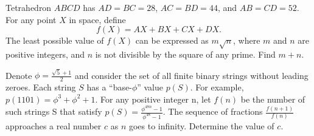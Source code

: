 \documentclass[11pt]{article}
\theoremstyle{definition}
\begin{document}
\begin{question}[name={2017 AIME II, \href{https://artofproblemsolving.com/community/c4p7910363}{Problem 15}}]
	Tetrahedron $ABCD$ has $AD=BC=28$, $AC=BD=44$, and $AB=CD=52$. For any point $X$ in space, define $$f(X)=AX+BX+CX+DX.$$ The least possible value of $f(X)$ can be expressed as $m\sqrt{n}$, where $m$ and $n$ are positive integers, and $n$ is not divisible by the square of any prime. Find $m+n$.
\end{question}

%
%	
%	
%	
%
%







\begin{question}[name={2017 HMMT, November Team, \href{https://artofproblemsolving.com/community/c129h1640164p10330916}{Problem 10}}]
	Denote $\phi=\frac{\sqrt{5}+1}{2}$ and consider the set of all finite binary strings without leading zeroes. Each string $S$ has a “base-$\phi$” value $p(S)$. For example, $p(1101)=\phi^3+\phi^2+1$. For any positive integer n, let $f(n)$ be the number of such strings S that satisfy $p(S) =\frac{\phi^{48n}-1}{\phi^{48}-1}$. The sequence of fractions $\frac{f(n+1)}{f(n)}$ approaches a real number $c$ as $n$ goes to infinity. Determine the value of $c$.	
\end{question}
\end{document}
